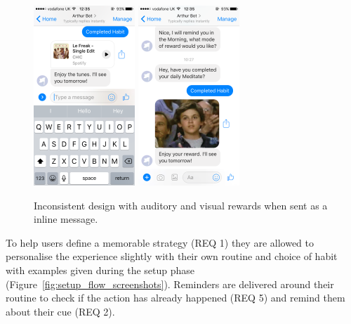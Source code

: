 \begin{figure}[H]
  \centering
  \includegraphics[width=1.5in]{../resources/design/reward-audio-inline.png}
  \hspace{10px}
  \includegraphics[width=1.5in]{../resources/design/reward-visual-inline.png}
  \caption{Inconsistent design with auditory and visual rewards when sent as a inline message.}
  \label{fig:rewards_inline}
\end{figure}

To help users define a memorable strategy (REQ 1) they are allowed to personalise the experience slightly with their own routine and choice of habit with examples given during the setup phase (Figure~\ref{fig:setup_flow_screenshots}). Reminders are delivered around their routine to check if the action has already happened (REQ 5) and remind them about their cue (REQ 2).

